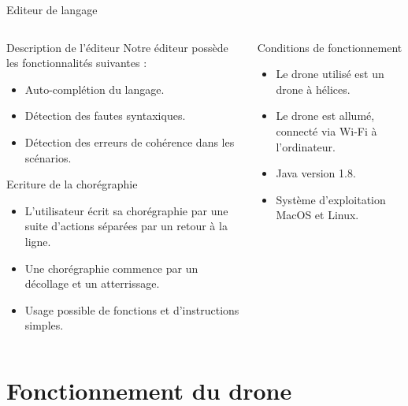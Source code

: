 \documentclass{bredelebeamer}
\begin{document}
\begin{frame}{Editeur de langage}
\begin{columns}
\begin{column}{0.5\textwidth}
\begin{block}{Description de l'éditeur}
Notre éditeur possède les fonctionnalités suivantes :
\begin{itemize}
\item Auto-complétion du langage. 
\item Détection des fautes syntaxiques.
\item Détection des erreurs de cohérence dans les scénarios.
\end{itemize}
\end{block}\pause


\begin{block}{Ecriture de la chorégraphie}
\begin{itemize}
\item L'utilisateur écrit sa chorégraphie par une suite d'actions séparées par un retour à  la ligne.
\item Une chorégraphie commence par un décollage et un atterrissage.
\item Usage possible de fonctions et d'instructions simples.
\end{itemize}
\end{block}\pause
\end{column}
\begin{column}{0.5\textwidth}
\begin{alertblock}{Conditions de fonctionnement}
\begin{itemize}
\item Le drone utilisé est un drone à  hélices. 
\item Le drone est allumé, connecté via Wi-Fi à l'ordinateur.
\item Java version 1.8. 
\item Système d'exploitation MacOS et Linux.
\end{itemize}
\end{alertblock}
\vspace{80px}
\end{column}
\end{columns}
\end{frame}



\section{Fonctionnement du drone}
\end{document}
